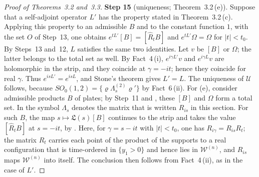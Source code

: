 \documentclass[11pt]{amsart}
\theoremstyle{definition}
\begin{document}
\begin{proof}[Proof of Theorems~3.2 and~3.3]
\textbf{Step 15} (uniqueness; Theorem~3.2\,(e)).
Suppose that a self-adjoint operator $L'$ has the property stated in Theorem~3.2\,(c).
Applying this property to an admissible $B$ and to the constant function $1$, with the set $O$ of Step~13, one obtains $e^{tL'}[B]=[\hat R_tB]$ and $e^{tL'}\Omega=\Omega$ for $|t|<t_0$.
By Steps~13 and~12, $L$ satisfies the same two identities.
Let $v$ be $[B]$ or $\Omega$; the latter belongs to the total set as well.
By Fact~4\,(i), $e^{i\gamma L'}v$ and $e^{i\gamma L}v$ are holomorphic in the strip, and they coincide at $\gamma=-it$; hence they coincide for real $\gamma$.
Thus $e^{isL'}=e^{isL}$, and Stone's theorem gives $L'=L$.
The uniqueness of $\mathcal U$ follows, because $SO_0(1,2)=\{\varrho\Lambda^{(2)}_s\varrho'\}$ by Fact~6\,(ii).
For (e), consider admissible products $B$ of plates; by Step~11 and \cite[Lemma~14.8]{QEDII}, these $[B]$ and $\Omega$ form a total set.
In \cite[Section~14.2]{QEDII} the symbol $\Lambda_s$ denotes the matrix that is written $R_{is}$ in this section.
For such $B$, the map $s\mapsto\mathfrak L(s)[B]$ continues to the strip and takes the value $[\hat R_tB]$ at $s=-it$, by \cite[Propositions~14.22\,(b), (c), 14.47\,(c), Lemmas~14.6\,(a), 14.9\,(b), (c), Definition~14.21]{QEDII}.
Here, for $\gamma=s-it$ with $|t|<t_0$, one has $R_{i\gamma}=R_{is}R_t$; the matrix $R_t$ carries each point of the product of the supports to a real configuration that is time-ordered in $\{y_1>0\}$ and hence lies in $\mathcal W^{(n)}$, and $R_{is}$ maps $\mathcal W^{(n)}$ into itself.
The conclusion then follows from Fact~4\,(ii), as in the case of $L'$.


\end{proof}
\end{document}
